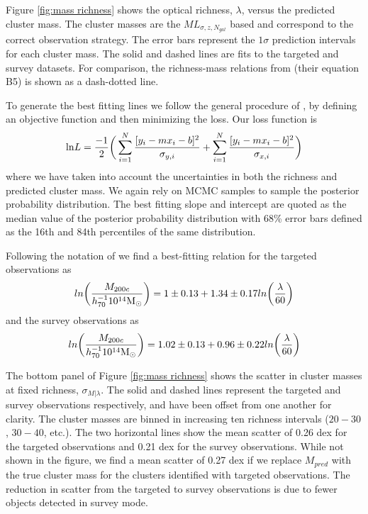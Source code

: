 \documentclass[fleqn,usenatbib]{mnras}
\begin{document}
Figure \ref{fig:mass richness} shows the optical richness, $\lambda$, versus the predicted cluster mass. The cluster masses are the $ML_{\sigma, z, N_{gal}}$ based and correspond to the correct observation strategy. The error bars represent the $1\sigma$ prediction intervals for each cluster mass. The solid and dashed lines are fits to the targeted and survey datasets. For comparison, the richness-mass relations from \cite{Rykoff2012} (their equation B5) is shown as a dash-dotted line.

To generate the best fitting lines we follow the general procedure of \cite{Hogg2010}, by defining an objective function and then minimizing the loss. Our loss function is
\begin{equation}
	\mathrm{ln}L= \frac{-1}{2} \bigg{(} \sum^N_{i=1}\frac{[y_i - mx_i - b]^2}{\sigma_{y,i}} + \sum^N_{i=1}\frac{[y_i - mx_i - b]^2}{\sigma_{x,i}} \bigg{)}
\end{equation} 
where we have taken into account the uncertainties in both the richness and predicted cluster mass. We again rely on MCMC samples to sample the posterior probability distribution. The best fitting slope and intercept are quoted as the median value of the posterior probability distribution with 68\% error bars defined as the 16th and 84th percentiles of the same distribution.

Following the notation of \cite{Rykoff2012} we find a best-fitting relation for the targeted observations as
\begin{equation}
	ln\bigg{(}\frac{M_{200c}}{h_{70}^{-1} 10^{14}\hbox{$\mathrm{M}_\odot$}}\bigg{)} = 1\pm0.13 + 1.34\pm0.17 ln\bigg{(}\frac{\lambda}{60}\bigg{)} \nonumber
\end{equation}
and the survey observations as
\begin{equation}
	ln\bigg{(}\frac{M_{200c}}{h_{70}^{-1} 10^{14}\hbox{$\mathrm{M}_\odot$}}\bigg{)} = 1.02\pm0.13 + 0.96\pm0.22 ln\bigg{(}\frac{\lambda}{60}\bigg{)} \nonumber
\end{equation}

The bottom panel of Figure \ref{fig:mass richness} shows the scatter in cluster masses at fixed richness, $\sigma_{M|\lambda}$. The solid and dashed lines represent the targeted and survey observations respectively, and have been offset from one another for clarity. The cluster masses are binned in increasing ten richness intervals ($20-30$, $30-40$, etc.). The two horizontal lines show the mean scatter of 0.26 dex for the targeted observations and 0.21 dex for the survey observations. While not shown in the figure, we find a mean scatter of 0.27 dex if we replace $M_{pred}$ with the true cluster mass for the clusters identified with targeted observations. The reduction in scatter from the targeted to survey observations is due to fewer objects detected in survey mode.
\end{document}
